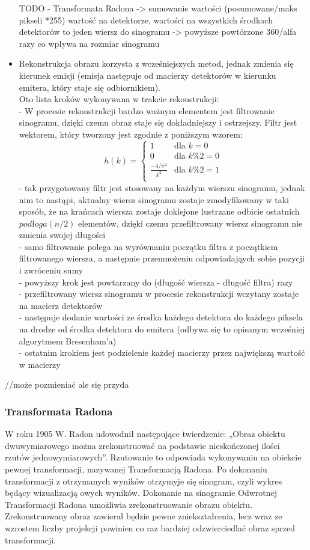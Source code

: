 \documentclass[A_4paper,12pt]{article}
\begin{document}
\begin{itemize}
TODO
- Transformata Radona
-> sumowanie wartości (posumowane/maks pikseli *255) wartość na detektorze, wartości na wszystkich środkach detektorów to jeden wiersz do sinogramu 
-> powyższe powtórzone 360/alfa razy co wpływa na rozmiar sinogramu 

\item Rekonstrukcja obrazu korzysta z wcześniejszych metod, jednak zmienia się kierunek emisji (emisja następuje od macierzy detektorów w kierunku emitera, który staje się odbiornikiem). \\
Oto lista kroków wykonywana w trakcie rekonstrukcji: \\
- W procesie rekonstrukcji bardzo ważnym elementem jest filtrowanie sinogramu, dzięki czemu obraz staje się dokładniejszy i ostrzejszy.
Filtr jest wektorem, który tworzony jest zgodnie z poniższym wzorem:
\[
 h(k) =
  \begin{cases}
   1 & \text{dla } k= 0 \\
   0 & \text{dla } k\% 2 = 0 \\
   \frac{-4/\pi^2}{k^2} & \text{dla } k\% 2 = 1 \\
  \end{cases}
\]
- tak przygotowany filtr jest stosowany na każdym wierszu sinogramu, jednak nim to nastąpi, aktualny wiersz sinogramu zostaje zmodyfikowany w taki sposób, że na krańcach wiersza zostaje doklejone lustrzane odbicie ostatnich $podłoga(n/2)$ elementów, dzięki czemu przefiltrowany wiersz sinogramu nie zmienia swojej długości \\
- samo filtrowanie polega na wyrównaniu początku filtra z początkiem filtrowanego wiersza, a następnie przemnożeniu odpowiadająych sobie pozycji i zwróceniu sumy \\
- powyższy krok jest powtarzany do (długość wiersza - długość filtra) razy \\
- przefiltrowany wiersz sinogramu w procesie rekonstrukcji wczytany zostaje na macierz detektorów \\
- następuje dodanie wartości ze środka każdego detektora do każdego piksela na drodze od środka detektora do emitera (odbywa się to opisanym wcześniej algorytmem Bresenham'a) \\
- ostatnim krokiem jest podzielenie każdej macierzy przez największą wartość w macierzy 
\end{itemize}


//może pozmieniać ale się przyda
\subsubsection{Transformata Radona}
W roku 1905 W. Radon udowodnił następujące twierdzenie: „Obraz obiektu dwuwymiarowego można zrekonstruować na podstawie nieskończonej ilości rzutów jednowymiarowych”. Rzutowanie to odpowiada wykonywaniu na obiekcie pewnej transformacji, nazywanej Transformacją Radona.
Po dokonaniu transformacji z otrzymanych wyników otrzymyje się sinogram, czyli wykres będący wizualizacją owych wyników.
Dokonanie na sinogramie Odwrotnej Transformacji Radona umożliwia zrekonstruowanie obrazu obiektu. Zrekonstruowany obraz zawierał będzie pewne zniekształcenia, lecz wraz ze wzrostem liczby projekcji powinien co raz bardziej odzwierciedlać obraz sprzed transformacji.
\end{document}
